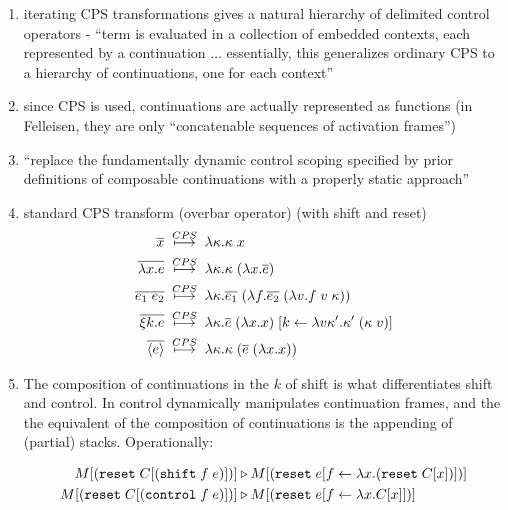 \documentclass[letterpaper]{llncs}
\begin{document}
\begin{enumerate}
	\item iterating CPS transformations gives a natural hierarchy of delimited control operators - ``term is evaluated in a collection of embedded contexts, each represented by a continuation $\ldots$ essentially, this generalizes ordinary CPS to a hierarchy of continuations, one for each context''
	\item since CPS is used, continuations are actually represented as functions (in Felleisen, they are only ``concatenable sequences of activation frames'')
	\item ``replace the fundamentally dynamic control scoping specified by prior definitions of composable continuations with a properly static approach''
	
	\item standard CPS transform (overbar operator) (with shift and reset) 
\begin{align*}
 \overline{x} 
  & \;  \stackrel{CPS}{\longmapsto}  \;  
  \lambda \kappa.  \kappa \; x     \\
 \overline{ \lambda x.e } 
  & \;  \stackrel{CPS}{\longmapsto}  \;  
  \lambda \kappa.  \kappa \;  ( \lambda x. \overline{e}  )      \\
 \overline{ e_1 \; e_2 }  
  & \;  \stackrel{CPS}{\longmapsto}  \;  
  \lambda \kappa.    \overline{e_1}   \;   ( \lambda f.    \overline{e_2}   \;   ( \lambda v.  f \;  v \; \kappa    )     )       \\
 \overline{ \xi k.e } 
  & \;  \stackrel{CPS}{\longmapsto}  \; 
  \lambda \kappa.      \overline{e}   \;    ( \lambda x.x )      \;  [k \leftarrow  \lambda v\kappa'. \kappa' \;  ( \kappa \; v )   ]      \\
 \overline{ \left\langle e \right\rangle } 
  & \;  \stackrel{CPS}{\longmapsto}  \; 
  \lambda \kappa.   \kappa  \;   (   \overline{e}   \;    ( \lambda x.x )    )      
\end{align*}

	\item The composition of continuations in the $k$ of shift is what differentiates shift and control. In control dynamically manipulates continuation frames, and the the equivalent of the composition of continuations is the appending of (partial) stacks. Operationally:
	
\begin{align*}
  M [  (\texttt{reset} \;   C[ (\texttt{shift} \; f \; e) ]  )  ]  &\triangleright
  M [  (\texttt{reset} \;  e[f \leftarrow  \lambda x. (\texttt{reset} \;  C[x] )  ])  ]  \\
  M [  (\texttt{reset} \;   C[ (\texttt{control} \; f \; e) ]  )  ]  &\triangleright
  M [  (\texttt{reset} \;  e[f \leftarrow  \lambda x. C[x]  ])  ]  \\
\end{align*}


\end{enumerate}
\end{document}
